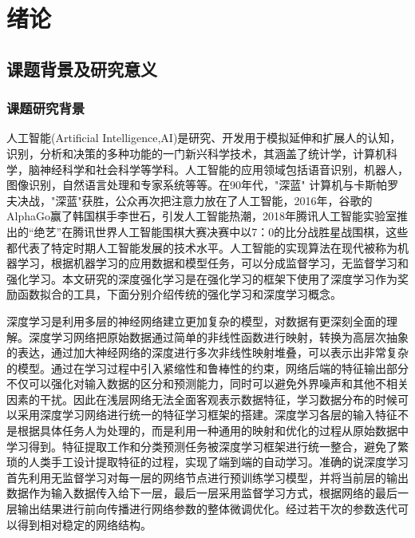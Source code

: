 \chapter{绪论}
\section{课题背景及研究意义}
\subsection{课题研究背景}
人工智能(Artificial Intelligence,AI)是研究、开发用于模拟延伸和扩展人的认知，识别，分析和决策的多种功能的一门新兴科学技术，其涵盖了统计学，计算机科学，脑神经科学和社会科学等学科。人工智能的应用领域包括语音识别，机器人，图像识别，自然语言处理和专家系统等等。在90年代，"深蓝" 计算机与卡斯帕罗夫决战，"深蓝"获胜，公众再次把注意力放在了人工智能，2016年，谷歌的AlphaGo赢了韩国棋手李世石，引发人工智能热潮，2018年腾讯人工智能实验室推出的“绝艺”在腾讯世界人工智能围棋大赛决赛中以7：0的比分战胜星战围棋\cite{人工智能产业形势分析课题组20182018}，这些都代表了特定时期人工智能发展的技术水平。人工智能的实现算法在现代被称为机器学习，根据机器学习的应用数据和模型任务，可以分成监督学习，无监督学习和强化学习。本文研究的深度强化学习是在强化学习的框架下使用了深度学习作为奖励函数拟合的工具，下面分别介绍传统的强化学习和深度学习概念。

深度学习是利用多层的神经网络建立更加复杂的模型，对数据有更深刻全面的理解。深度学习网络把原始数据通过简单的非线性函数进行映射，转换为高层次抽象的表达，通过加大神经网络的深度进行多次非线性映射堆叠，可以表示出非常复杂的模型。通过在学习过程中引入紧缩性和鲁棒性的约束，网络后端的特征输出部分不仅可以强化对输入数据的区分和预测能力，同时可以避免外界噪声和其他不相关因素的干扰。因此在浅层网络无法全面客观表示数据特征，学习数据分布的时候可以采用深度学习网络进行统一的特征学习框架的搭建。深度学习各层的输入特征不是根据具体任务人为处理的，而是利用一种通用的映射和优化的过程从原始数据中学习得到。特征提取工作和分类预测任务被深度学习框架进行统一整合，避免了繁琐的人类手工设计提取特征的过程，实现了端到端的自动学习。准确的说深度学习首先利用无监督学习对每一层的网络节点进行预训练学习模型，并将当前层的输出数据作为输入数据传入给下一层，最后一层采用监督学习方式，根据网络的最后一层输出结果进行前向传播进行网络参数的整体微调优化。经过若干次的参数迭代可以得到相对稳定的网络结构。

